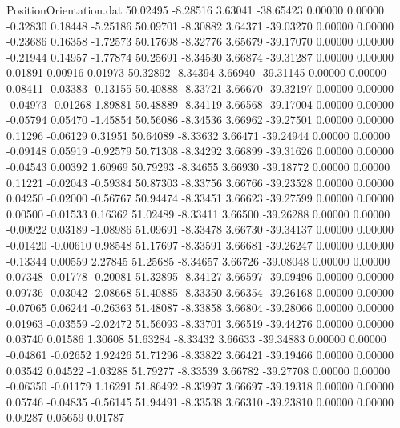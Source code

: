 \begin{filecontents}{PositionOrientation.dat}
  50.02495   -8.28516    3.63041   -38.65423    0.00000    0.00000   -0.32830    0.18448   -5.25186
  50.09701   -8.30882    3.64371   -39.03270    0.00000    0.00000   -0.23686    0.16358   -1.72573
  50.17698   -8.32776    3.65679   -39.17070    0.00000    0.00000   -0.21944    0.14957   -1.77874
  50.25691   -8.34530    3.66874   -39.31287    0.00000    0.00000    0.01891    0.00916    0.01973
  50.32892   -8.34394    3.66940   -39.31145    0.00000    0.00000    0.08411   -0.03383   -0.13155
  50.40888   -8.33721    3.66670   -39.32197    0.00000    0.00000   -0.04973   -0.01268    1.89881
  50.48889   -8.34119    3.66568   -39.17004    0.00000    0.00000   -0.05794    0.05470   -1.45854
  50.56086   -8.34536    3.66962   -39.27501    0.00000    0.00000    0.11296   -0.06129    0.31951
  50.64089   -8.33632    3.66471   -39.24944    0.00000    0.00000   -0.09148    0.05919   -0.92579
  50.71308   -8.34292    3.66899   -39.31626    0.00000    0.00000   -0.04543    0.00392    1.60969
  50.79293   -8.34655    3.66930   -39.18772    0.00000    0.00000    0.11221   -0.02043   -0.59384
  50.87303   -8.33756    3.66766   -39.23528    0.00000    0.00000    0.04250   -0.02000   -0.56767
  50.94474   -8.33451    3.66623   -39.27599    0.00000    0.00000    0.00500   -0.01533    0.16362
  51.02489   -8.33411    3.66500   -39.26288    0.00000    0.00000   -0.00922    0.03189   -1.08986
  51.09691   -8.33478    3.66730   -39.34137    0.00000    0.00000   -0.01420   -0.00610    0.98548
  51.17697   -8.33591    3.66681   -39.26247    0.00000    0.00000   -0.13344    0.00559    2.27845
  51.25685   -8.34657    3.66726   -39.08048    0.00000    0.00000    0.07348   -0.01778   -0.20081
  51.32895   -8.34127    3.66597   -39.09496    0.00000    0.00000    0.09736   -0.03042   -2.08668
  51.40885   -8.33350    3.66354   -39.26168    0.00000    0.00000   -0.07065    0.06244   -0.26363
  51.48087   -8.33858    3.66804   -39.28066    0.00000    0.00000    0.01963   -0.03559   -2.02472
  51.56093   -8.33701    3.66519   -39.44276    0.00000    0.00000    0.03740    0.01586    1.30608
  51.63284   -8.33432    3.66633   -39.34883    0.00000    0.00000   -0.04861   -0.02652    1.92426
  51.71296   -8.33822    3.66421   -39.19466    0.00000    0.00000    0.03542    0.04522   -1.03288
  51.79277   -8.33539    3.66782   -39.27708    0.00000    0.00000   -0.06350   -0.01179    1.16291
  51.86492   -8.33997    3.66697   -39.19318    0.00000    0.00000    0.05746   -0.04835   -0.56145
  51.94491   -8.33538    3.66310   -39.23810    0.00000    0.00000    0.00287    0.05659    0.01787

\end{filecontents}
